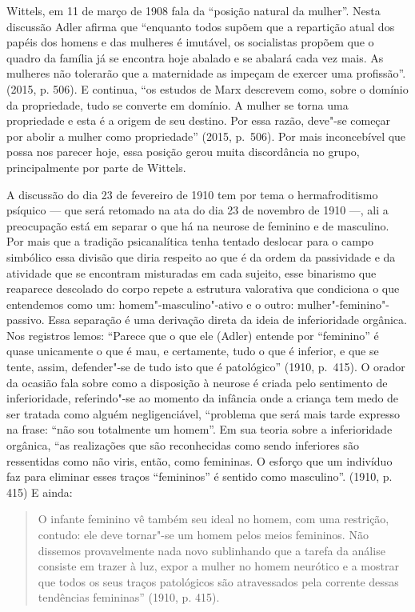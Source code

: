 Wittels, em 11 de março de 1908 fala da ``posição natural da mulher''.
Nesta discussão Adler afirma que ``enquanto todos supõem que a repartição
atual dos papéis dos homens e das mulheres é imutável, os socialistas
propõem que o quadro da família já se encontra hoje abalado e se abalará
cada vez mais. As mulheres não tolerarão que a maternidade as impeçam de
exercer uma profissão''. (2015, p. 506). E continua, ``os estudos de Marx
descrevem como, sobre o domínio da propriedade, tudo se converte em
domínio. A mulher se torna uma propriedade e esta é a origem de seu
destino. Por essa razão, deve"-se começar por abolir a mulher como
propriedade'' (2015, p.~506). Por mais inconcebível que possa nos parecer
hoje, essa posição gerou muita discordância no grupo, principalmente por
parte de Wittels.

A discussão do dia 23 de fevereiro de 1910 tem por tema o
hermafroditismo psíquico --- que será retomado na ata do dia 23 de
novembro de 1910 ---, ali a preocupação está em separar o que há na
neurose de feminino e de masculino. Por mais que a tradição
psicanalítica tenha tentado deslocar para o campo simbólico essa divisão
que diria respeito ao que é da ordem da passividade e da atividade que
se encontram misturadas em cada sujeito, esse binarismo que reaparece
descolado do corpo repete a estrutura valorativa que condiciona o que
entendemos como um: homem"-masculino"-ativo e o outro:
mulher"-feminino"-passivo. Essa separação é uma derivação direta da ideia
de inferioridade orgânica. Nos registros lemos: ``Parece que o que ele
(Adler) entende por ``feminino'' é quase unicamente o que é mau, e
certamente, tudo o que é inferior, e que se tente, assim, defender"-se de
tudo isto que é patológico'' (1910, p.~415). O orador da ocasião fala
sobre como a disposição à neurose é criada pelo sentimento de
inferioridade, referindo"-se ao momento da infância onde a criança tem
medo de ser tratada como alguém negligenciável, ``problema que será mais
tarde expresso na frase: ``não sou totalmente um homem''. Em sua teoria
sobre a inferioridade orgânica, ``as realizações que são reconhecidas
como sendo inferiores são ressentidas como não viris, então, como
femininas. O esforço que um indivíduo faz para eliminar esses traços
``femininos'' é sentido como masculino''. (1910, p. 415) E ainda:

\begin{quote}
O infante feminino vê também seu ideal no homem, com uma restrição,
contudo: ele deve tornar"-se um homem pelos meios femininos. Não dissemos
provavelmente nada novo sublinhando que a tarefa da análise consiste em
trazer à luz, expor a mulher no homem neurótico e a mostrar que todos os
seus traços patológicos são atravessados pela corrente dessas tendências
femininas'' (1910, p. 415).
\end{quote}

